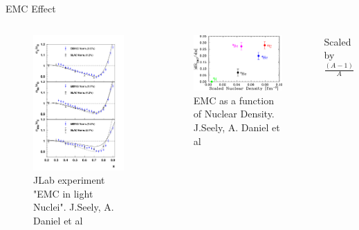 \documentclass{beamer}
\begin{document}
\begin{frame}{EMC Effect}
\begin{columns}
\vspace{-15pt}
\begin{figure}
	\caption{\label{E03103} JLab experiment "EMC in light Nuclei". J.Seely, A. Daniel et al}
	\vspace{-20pt}
	\includegraphics[width =5cm]{../images/carbon_be_he4}
\end{figure}
\hspace{10pt}
\begin{figure}
	\caption{\label{E03103_1} EMC as a function of Nuclear Density. J.Seely, A. Daniel et al}
	\includegraphics[width =6cm]{../images/PRL_slopes}
\end{figure}
\centering
Scaled by $\frac{\left(A-1\right)}{A}$
\end{columns}
\end{frame}

\end{document}
